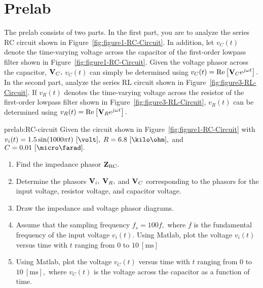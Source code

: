 \section{Prelab}
\label{sec:prelab}
%
The prelab consists of two parts. In the first part, you are to analyze the series RC circuit shown in Figure~\ref{fig:figure1-RC-Circuit}. In addition, let $v_C(t)$ denote the time-varying voltage across the capacitor of the first-order lowpass filter shown in Figure~\ref{fig:figure1-RC-Circuit}. Given the voltage phasor across the capacitor, ${\bf V}_C,$ $v_C(t)$ can simply be determined using %
%
  $v_C(t) = \mathrm{Re}\left[{\bf V}_Ce^{j\omega t}\right].$
%
In the second part, analyze the series RL circuit shown in Figure~\ref{fig:figure3-RL-Circuit}.  If $v_R(t)$ denotes the time-varying voltage across the resistor of the first-order lowpass filter shown in Figure~\ref{fig:figure3-RL-Circuit}, $v_R(t)$ can be determined using %
%
  $v_R(t) = \mathrm{Re}\left[{\bf V}_Re^{j\omega t}\right].$
%


\begin{prelab}{prelab:RC-circuit}
%
Given the circuit shown in Figure~\ref{fig:figure1-RC-Circuit} with $v_i(t) = 1.5\sin(1000\pi t)~[\volt],$ $R = 6.8~[\kilo\ohm],$ and $C = 0.01~[\micro\farad].$ 
      \begin{enumerate}
        \item Find the impedance phasor ${\bf Z}_{\text{RC}}.$
        \item Determine the phasors ${\bf V}_i,$ ${\bf V}_R,$ and ${\bf V}_C$ corresponding to the phasors for the input voltage, resistor voltage, and capacitor voltage.
          \item Draw the impedance and voltage phasor diagrams.
        \item Assume that  the sampling frequency $f_s = 100f,$ where $f$ is the fundamental frequency of the input voltage $v_i(t).$ Using Matlab, plot the voltage $v_i(t)$ versus time with $t$ ranging from $0$ to $10~[\si{\milli\second}]$
          \item Using Matlab, plot the voltage $v_C(t)$ versus time with $t$ ranging from $0$ to $10~[\si{\milli\second}],$ where $v_C(t)$ is the voltage across the capacitor as a function of time.            
        \end{enumerate}
\end{prelab}


